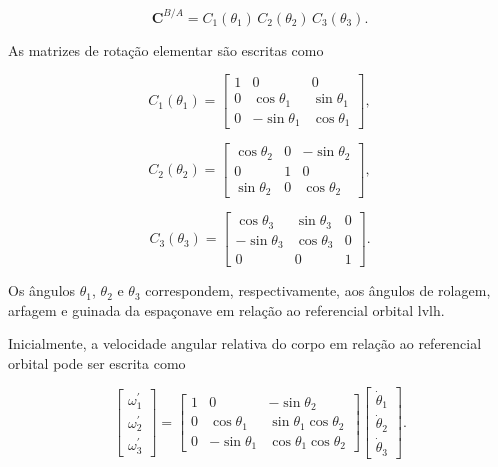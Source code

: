 \begin{equation}
\mathbf{C}^{B/A}
=
C_1(\theta_1)\,C_2(\theta_2)\,C_3(\theta_3).
\label{eq_sequencia_c1c2c3_orbital}
\end{equation}

As matrizes de rotação elementar são escritas como \cite{wie2008space}

\begin{equation}
C_1(\theta_1)=
\begin{bmatrix}
1 & 0 & 0 \\
0 & \cos\theta_1 & \sin\theta_1 \\
0 & -\sin\theta_1 & \cos\theta_1
\end{bmatrix},
\label{eq_C1_theta1}
\end{equation}

\begin{equation}
C_2(\theta_2)=
\begin{bmatrix}
\cos\theta_2 & 0 & -\sin\theta_2 \\
0 & 1 & 0 \\
\sin\theta_2 & 0 & \cos\theta_2
\end{bmatrix},
\label{eq_C2_theta2}
\end{equation}

\begin{equation}
C_3(\theta_3)=
\begin{bmatrix}
\cos\theta_3 & \sin\theta_3 & 0 \\
-\sin\theta_3 & \cos\theta_3 & 0 \\
0 & 0 & 1
\end{bmatrix}.
\label{eq_C3_theta3}
\end{equation}

Os ângulos $\theta_1$, $\theta_2$ e $\theta_3$ correspondem, respectivamente, aos ângulos de rolagem, arfagem e guinada da espaçonave em relação ao referencial orbital \gls{lvlh}.

Inicialmente, a velocidade angular relativa do corpo em relação ao referencial orbital pode ser escrita como \cite{wie2008space}

\begin{equation}
\begin{bmatrix}
\omega^{\prime}_1 \\
\omega^{\prime}_2 \\
\omega^{\prime}_3
\end{bmatrix}
=
\begin{bmatrix}
1 & 0 & -\sin\theta_2 \\
0 & \cos\theta_1 & \sin\theta_1\cos\theta_2 \\
0 & -\sin\theta_1 & \cos\theta_1\cos\theta_2
\end{bmatrix}
\begin{bmatrix}
\dot{\theta}_1 \\
\dot{\theta}_2 \\
\dot{\theta}_3
\end{bmatrix}.
\label{eq_bongwie_6150}
\end{equation}

